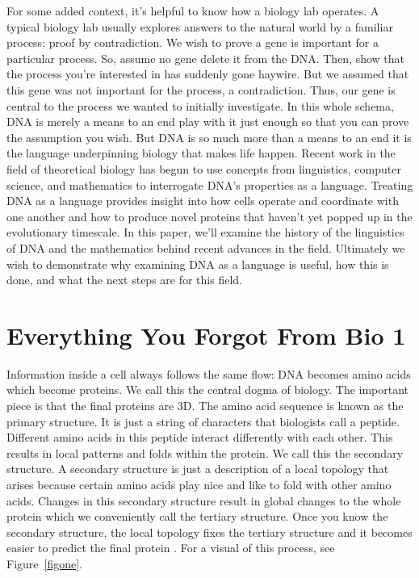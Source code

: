 \documentclass{SBCbookchapter}
\begin{document}
For some added context, it’s helpful to know how a biology lab operates. A typical biology lab usually explores answers to the natural world by a familiar process: proof by contradiction. We wish to 
prove a gene is important for a particular process. So, assume no gene \textemdash delete it from the DNA. Then, show that the process you’re interested in has suddenly gone haywire. But we assumed that 
this gene was not important for the process, a contradiction. Thus, our gene is central to the process we wanted to initially investigate. In this whole schema, DNA is merely a means to an end 
\textemdash play with it just enough so that you can prove the assumption you wish. But DNA is so much more than a means to an end \textemdash it is the language underpinning biology that makes life 
happen. Recent work in the field of theoretical biology has begun to use concepts from linguistics, computer science, and mathematics to interrogate DNA’s properties as a language. Treating DNA as a 
language provides insight into how cells operate and coordinate with one another and how to produce novel proteins that haven’t yet popped up in the evolutionary timescale. In this paper, we’ll examine 
the history of the linguistics of DNA and the mathematics behind recent advances in the field. Ultimately we wish to demonstrate why examining DNA as a language is useful, how this is done, and what the 
next steps are for this field. 


\section{Everything You Forgot From Bio 1}

Information inside a cell always follows the same flow: DNA becomes amino acids which become proteins. We call this the central dogma of biology. The important piece is that the final proteins are 3D. 
The amino acid sequence is known as the primary structure. It is just a string of characters that biologists call a peptide. Different amino acids in this peptide interact differently with each other. 
This results in local patterns and folds within the protein. We call this the secondary structure. A secondary structure is just a description of a local topology that arises because certain amino acids 
play nice and like to fold with other amino acids. Changes in this secondary structure result in global changes to the whole protein which we conveniently call the tertiary structure. Once you know the 
secondary structure, the local topology fixes the tertiary structure and it becomes easier to predict the final protein \cite{fleming_secondary_2006}. For a visual of this process, see 
Figure~\ref{figone}. 
\end{document}
